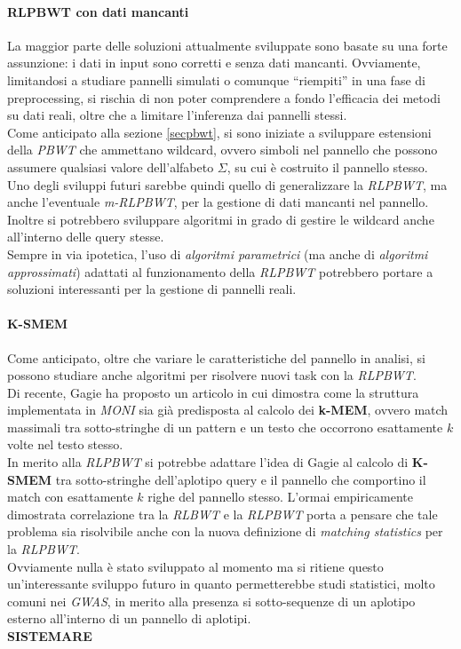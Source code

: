\paragraph{RLPBWT con dati mancanti}
La maggior parte delle soluzioni attualmente sviluppate sono basate su una forte
assunzione: i dati in input sono corretti e senza dati mancanti. Ovviamente,
limitandosi a studiare pannelli simulati o comunque ``riempiti'' in una fase di
preprocessing, si rischia di non poter comprendere a fondo l'efficacia dei
metodi su dati reali, oltre che a limitare l'inferenza dai pannelli stessi.\\
Come anticipato alla sezione \ref{secpbwt}, si sono iniziate a sviluppare
estensioni della \textit{PBWT} che ammettano wildcard, ovvero simboli nel
pannello che possono assumere qualsiasi valore dell'alfabeto $\Sigma$, su cui è
costruito il pannello stesso.\\
Uno degli sviluppi futuri sarebbe quindi quello di generalizzare la
\textit{RLPBWT}, ma anche l'eventuale \textit{m-RLPBWT}, per la gestione di dati
mancanti nel pannello. Inoltre si potrebbero sviluppare algoritmi in grado di
gestire le wildcard anche all'interno delle query stesse.\\
Sempre in via ipotetica, l'uso di \textit{algoritmi parametrici} (ma anche
di \textit{algoritmi approssimati}) adattati al
funzionamento della \textit{RLPBWT} potrebbero portare a soluzioni interessanti
per la gestione di pannelli reali.
\paragraph{K-SMEM}
Come anticipato, oltre che variare le caratteristiche del pannello in analisi,
si possono studiare anche algoritmi per risolvere nuovi task con la
\textit{RLPBWT}.\\ 
Di recente, Gagie \cite{kmems} ha proposto un articolo in cui dimostra come
la struttura implementata in \textit{MONI} \cite{moni} sia già predisposta al
calcolo dei \textbf{k-MEM}, ovvero match massimali tra sotto-stringhe di un
pattern e un testo che occorrono esattamente $k$ volte nel testo stesso.\\
In merito alla \textit{RLPBWT} si potrebbe adattare l'idea di Gagie al calcolo
di \textbf{K-SMEM} tra sotto-stringhe dell'aplotipo query e il pannello che
comportino il match con esattamente $k$ righe del pannello stesso. L'ormai
empiricamente dimostrata correlazione tra la \textit{RLBWT} e la \textit{RLPBWT}
porta a pensare che tale problema sia risolvibile anche con la nuova definizione
di \textit{matching statistics} per la \textit{RLPBWT}.\\
Ovviamente nulla è stato sviluppato al momento ma si ritiene questo
un'interessante sviluppo futuro in quanto permetterebbe studi statistici, molto
comuni nei \textit{GWAS}, in merito alla presenza si sotto-sequenze di un
aplotipo esterno all'interno di un pannello di aplotipi.\\
\textbf{SISTEMARE}
